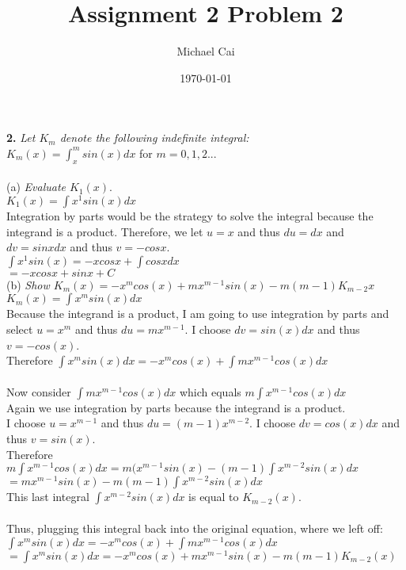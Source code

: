 \documentclass[11pt, oneside]{article}   	%
\title{Assignment 2 Problem 2}
\author{Michael Cai}
\date{\today}							%
\begin{document}
\maketitle

\noindent \textbf{2.} \textit{Let $K_m$ denote the following indefinite integral:}\\
$K_m(x) = \int_ x^m sin(x)dx$ for $m = 0,1,2...$\\~\\
(a) \textit{Evaluate $K_1(x)$}. \\
$K_1(x) = \int x^1 sin(x)dx$\\
Integration by parts would be the strategy to solve the integral because the integrand is a product. Therefore, we let $u = x$ and thus $du = dx$ and $dv = sinxdx$ and thus $v = -cosx$.\\
$\int x^1 sin(x) = -xcosx + \int cosxdx$ \\
$ = -xcosx + sinx + C$\\

\noindent (b) \textit {Show $K_m(x) = -x^m cos(x) + mx^{m-1}sin(x) - m(m-1)K_{m-2}x$}\\
$K_m(x) = \int x^m sin(x)dx$\\
Because the integrand is a product, I am going to use integration by parts and select $u = x^m$ and thus $du = mx^{m-1}$. I choose $dv = sin(x)dx$ and thus $v = -cos(x)$. \\
Therefore $\int x^msin(x)dx = -x^mcos(x) + \int mx^{m-1}cos(x)dx$\\~\\
Now consider $\int mx^{m-1}cos(x)dx$ which equals $m \int x^{m-1}cos(x)dx$\\
Again we use integration by parts because the integrand is a product.\\
I choose $u = x^{m-1}$ and thus $du = (m-1)x^{m-2}$. I choose $dv = cos(x)dx$ and thus $v = sin(x)$.\\
Therefore $m \int x^{m-1} cos(x)dx = m(x^{m-1}sin(x) - (m-1) \int x^{m-2}sin(x)dx$\\
$= mx^{m-1}sin(x)-m(m-1) \int x^{m-2} sin(x)dx$\\
This last integral $\int x^{m-2} sin(x)dx$ is equal to $K_{m-2}(x)$. \\~\\
Thus, plugging this integral back into the original equation, where we left off: \\
$\int x^msin(x)dx = -x^mcos(x) + \int mx^{m-1}cos(x)dx$\\
$= \int x^msin(x)dx = -x^mcos(x) + mx^{m-1}sin(x)-m(m-1) K_{m-2}(x)$\\~\\~\\
\end{document}
